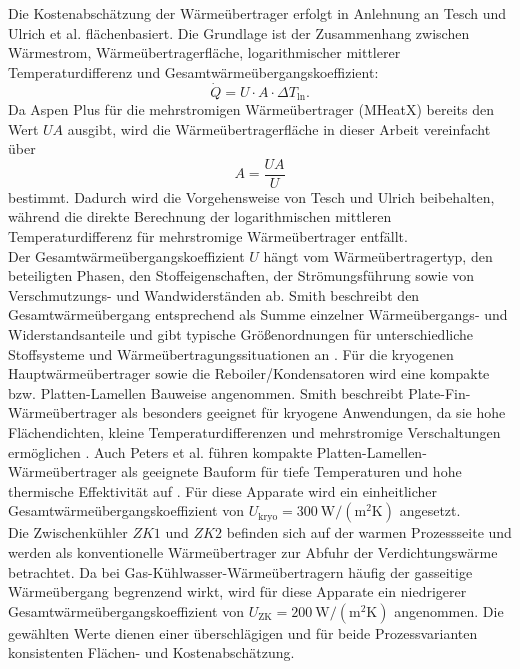 Die Kostenabschätzung der Wärmeübertrager erfolgt in Anlehnung an Tesch \cite{teschExergybasedMethodsApplied} und Ulrich et al. \cite{ulrich2004chemical} flächenbasiert. Die Grundlage ist der Zusammenhang zwischen Wärmestrom, Wärmeübertragerfläche, logarithmischer mittlerer Temperaturdifferenz und Gesamtwärmeübergangskoeffizient:
\begin{equation}
\dot Q = U \cdot A \cdot \Delta T_{\ln}.
\end{equation}
Da Aspen Plus für die mehrstromigen Wärmeübertrager (MHeatX) bereits den Wert $UA$ ausgibt, wird die Wärmeübertragerfläche in dieser Arbeit vereinfacht über
\begin{equation}
A = \frac{UA}{U}
\end{equation}
bestimmt. Dadurch wird die Vorgehensweise von Tesch und Ulrich beibehalten, während die direkte Berechnung der logarithmischen mittleren Temperaturdifferenz für mehrstromige Wärmeübertrager entfällt.\\
Der Gesamtwärmeübergangskoeffizient $U$ hängt vom Wärmeübertragertyp, den beteiligten Phasen, den Stoffeigenschaften, der Strömungsführung sowie von
Verschmutzungs- und Wandwiderständen ab. Smith beschreibt den Gesamtwärmeübergang entsprechend als Summe einzelner Wärmeübergangs- und Widerstandsanteile und gibt
typische Größenordnungen für unterschiedliche Stoffsysteme und
Wärmeübertragungssituationen an \cite{smithChemicalProcessDesign}. Für die kryogenen Hauptwärmeübertrager sowie die Reboiler/Kondensatoren wird eine kompakte bzw. Platten-Lamellen Bauweise angenommen. Smith beschreibt Plate-Fin-Wärmeübertrager als besonders geeignet für kryogene Anwendungen, da sie hohe Flächendichten, kleine Temperaturdifferenzen und mehrstromige Verschaltungen ermöglichen  \cite{smithChemicalProcessDesign}. Auch Peters et al. führen kompakte  Platten-Lamellen-Wärmeübertrager als geeignete Bauform für tiefe Temperaturen und hohe thermische Effektivität auf \cite{petersPlantDesignEconomics2004}. Für diese Apparate wird ein einheitlicher Gesamtwärmeübergangskoeffizient von $U_\mathrm{kryo}=300~\mathrm{W/(m^2K)}$ angesetzt.\\
Die Zwischenkühler $ZK1$ und $ZK2$ befinden sich auf der warmen Prozessseite und werden als konventionelle Wärmeübertrager zur Abfuhr der Verdichtungswärme betrachtet. Da bei Gas-Kühlwasser-Wärmeübertragern häufig der gasseitige Wärmeübergang begrenzend wirkt, wird für diese Apparate ein niedrigerer Gesamtwärmeübergangskoeffizient von $U_\mathrm{ZK}=200~\mathrm{W/(m^2K)}$ angenommen. Die gewählten Werte dienen einer überschlägigen und für beide Prozessvarianten konsistenten Flächen- und Kostenabschätzung.


